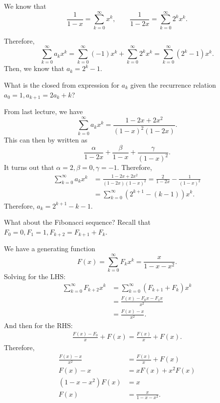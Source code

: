 We know that \[
	\frac{1}{1-x} = \sum_{k=0}^{\infty}x^{k}, \qquad \frac{1}{1-2x} = \sum_{k=0}^{\infty}2^kx^{k}
.\] 

Therefore, \[
	\sum_{k=0}^{\infty}a_kx^k  = \sum_{k=0}^{\infty}(-1)x^{k} + \sum_{k=0}^{\infty}2^kx^{k} = \sum_{k=0}^{\infty}(2^k-1)x^{k}
.\] Then, we know that \( a_k = 2^k-1 \).

\begin{eg}
	What is the closed from expression for \( a_k \) given the recurrence relation \( a_0=1, a_{k+1}=2a_k+k \)?
\end{eg}
From last lecture, we have \[
	\sum_{k=0}^{\infty} a_kx^{k} = \frac{1-2x+2x^2}{(1-x)^2(1-2x)}
.\] This can then by written as \[
	\frac{\alpha}{1-2x} + \frac{\beta}{1-x} +\frac{\gamma}{(1-x)^2}
.\] It turns out that \( \alpha = 2, \beta = 0, \gamma = -1 \). Therefore,
\begin{align*}
	\sum_{k=0}^{\infty}a_kx^k&=\frac{1-2x+2x^2}{(1-2x)(1-x)^2} = \frac{2}{1-2x} - \frac{1}{(1-x)^2} \\
														&= \sum_{k=0}^{\infty}(2^{k+1}-(k-1)) x^k
.\end{align*}
Therefore, \( a_k=2^{k+1}-k-1  \).

\begin{eg}
	What about the Fibonacci sequence? Recall that \( F_0=0, F_1=1, F_{k+2}=F_{k+1}+F_k \).
\end{eg}

We have a generating function \[
	F(x) = \sum_{k=0}^{\infty}F_kx^k = \frac{x}{1-x-x^2}
.\] 
Solving for the LHS:
\begin{align*}
	\sum_{k=0}^{\infty} F_{k+2}x^k &= \sum_{k=0}^{\infty}(F_{k+1} + F_{k})x^k \\
																	&= \frac{F(x) - F_{0}x - F_{1}x}{x^2} \\
																	&= \frac{F(x) - x}{x^2}
.\end{align*}
And then for the RHS:
\begin{align*}
	\frac{F(x)-F_{0}}{x} + F(x) = \frac{F(x)}{x} + F(x)
.\end{align*}
Therefore,
\begin{align*}
	\frac{F(x)-x}{x^2} &= \frac{F(x)}{x}+F(x) \\
	F(x) - x &= xF(x) + x^2F(x) \\
	(1 - x - x^2)F(x) &= x \\
	F(x) &= \frac{x}{1-x-x^2}
.\end{align*}

